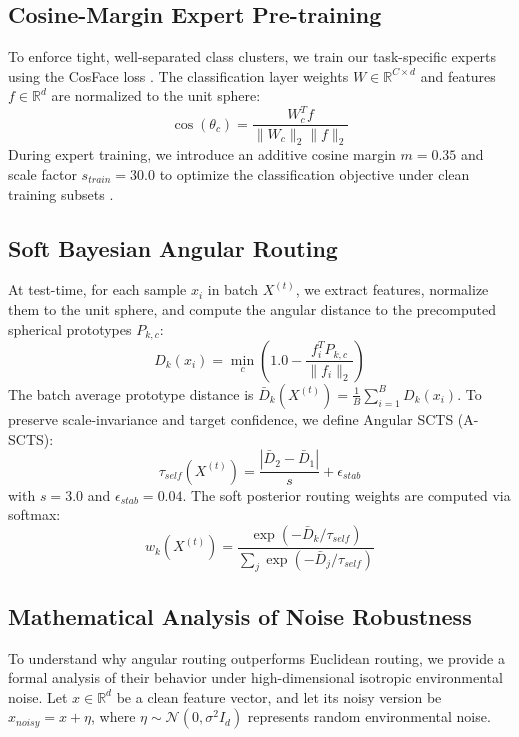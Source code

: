 \documentclass{article}
\theoremstyle{definition}
\theoremstyle{remark}
\begin{document}
\subsection{Cosine-Margin Expert Pre-training}
To enforce tight, well-separated class clusters, we train our task-specific experts using the CosFace loss \cite{chen2022_24}. The classification layer weights $W \in \mathbb{R}^{C \times d}$ and features $f \in \mathbb{R}^d$ are normalized to the unit sphere:
\begin{equation}
\cos(\theta_c) = \frac{W_c^T f}{\|W_c\|_2 \|f\|_2}
\end{equation}
During expert training, we introduce an additive cosine margin $m = 0.35$ and scale factor $s_{train} = 30.0$ to optimize the classification objective under clean training subsets \cite{fu2025_100}.

\subsection{Soft Bayesian Angular Routing}
At test-time, for each sample $x_i$ in batch $X^{(t)}$, we extract features, normalize them to the unit sphere, and compute the angular distance to the precomputed spherical prototypes $P_{k,c}$:
\begin{equation}
D_k(x_i) = \min_c \left( 1.0 - \frac{f_i^T P_{k,c}}{\|f_i\|_2} \right)
\end{equation}
The batch average prototype distance is $\bar{D}_k(X^{(t)}) = \frac{1}{B} \sum_{i=1}^B D_k(x_i)$. To preserve scale-invariance and target confidence, we define Angular SCTS (A-SCTS):
\begin{equation}
\tau_{self}(X^{(t)}) = \frac{|\bar{D}_2 - \bar{D}_1|}{s} + \epsilon_{stab}
\end{equation}
with $s = 3.0$ and $\epsilon_{stab} = 0.04$. The soft posterior routing weights are computed via softmax:
\begin{equation}
w_k(X^{(t)}) = \frac{\exp(-\bar{D}_k / \tau_{self})}{\sum_j \exp(-\bar{D}_j / \tau_{self})}
\end{equation}

\subsection{Mathematical Analysis of Noise Robustness}
To understand why angular routing outperforms Euclidean routing, we provide a formal analysis of their behavior under high-dimensional isotropic environmental noise. Let $x \in \mathbb{R}^d$ be a clean feature vector, and let its noisy version be $x_{noisy} = x + \eta$, where $\eta \sim \mathcal{N}(0, \sigma^2 I_d)$ represents random environmental noise.
\end{document}
